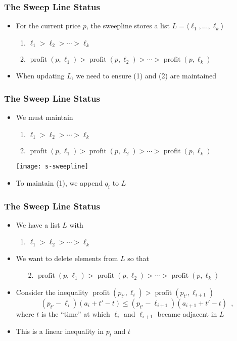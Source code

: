 \documentclass{beamer}
\DeclareMathOperator{\val}{profit}
\begin{document}
\frame
{
  \frametitle{The Sweep Line Status}
  \begin{itemize}
    \item For the current price $p$, the sweepline stores a list $L=\langle
\ell_1,\ldots,\ell_k\rangle$
    \begin{enumerate}
      \item $\ell_1>\ell_2>\cdots>\ell_k$
      \item $\val(p,\ell_1)>\val(p,\ell_2)>\cdots>\val(p,\ell_k)$
    \end{enumerate}
    \item When updating $L$, we need to ensure (1) and (2) are maintained
  \end{itemize}
}

\frame
{
  \frametitle{The Sweep Line Status}
  \begin{itemize}
    \item We must maintain
    \begin{enumerate}
      \item $\ell_1>\ell_2>\cdots>\ell_k$
      \item $\val(p,\ell_1)>\val(p,\ell_2)>\cdots>\val(p,\ell_k)$
    \end{enumerate}
    \texttt{[image: s-sweepline]}
    \item To maintain (1), we append $q_i$ to $L$
  \end{itemize}
}

\frame
{
  \frametitle{The Sweep Line Status}
  \begin{itemize}
    \item We have a list $L$ with
    \begin{enumerate}
      \item $\ell_1>\ell_2>\cdots>\ell_k$
    \end{enumerate}
    \item We want to delete elements from $L$ so that
    \begin{enumerate} 
      \item[2.] $\val(p,\ell_1)>\val(p,\ell_2)>\cdots>\val(p,\ell_k)$
    \end{enumerate}
    \item Consider the inequality $\val(p_{t'},\ell_i) > \val(p_{t'},\ell_{i+1})$
      \[
         (p_{t'}-\ell_i)(a_i+t'-t) \le (p_{t'}-\ell_{i+1})(a_{i+1}+t'-t)  \enspace , 
      \]
      where $t$ is the ``time'' at which $\ell_i$ and $\ell_{i+1}$ became
adjacent in $L$
    \item This is a linear inequality in $p_t$ and $t$
  \end{itemize}
}
\end{document}
